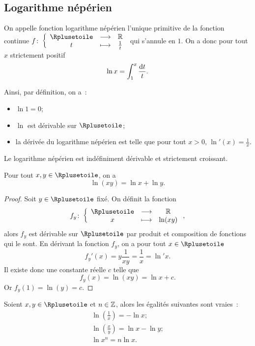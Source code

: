 \subsection{Logarithme népérien}
\label{subsec:chap1-lognep}
%
\begin{defdef}
\label{def:chap1-deflognep}
On appelle fonction logarithme népérien l'unique primitive de la fonction continue $\fonction{f}{\Rplusetoile}{\R}{t}{\frac{1}{t}}$ qui s'annule en $1$. On a donc pour tout $x$ strictement positif
\begin{equation} 
  \ln x=\int_{1}^{x} \frac{\mathop{}\mathopen{}\mathrm{d} t}{t}.
\end{equation}
\end{defdef}
%
Ainsi, par définition, on a~: 
\begin{itemize}
\item $\ln 1 = 0$;
\item $\ln$ est dérivable sur $\Rplusetoile$;
\item la dérivée du logarithme népérien est telle que pour tout $x>0$, $\ln'(x)=\frac{1}{x}$.
\end{itemize}
Le logarithme népérien est indéfiniment dérivable et strictement croissant.
%
\begin{theo}
\label{theo:lognep1}
  Pour tout $x, y \in \Rplusetoile$, on a 
  \begin{equation} 
    \ln(xy)=\ln x + \ln y. 
  \end{equation}  
\end{theo}
\begin{proof}
  Soit $y \in \Rplusetoile$ fixé. On définit la fonction 
  \begin{equation}
    \fonction{f_y}{\Rplusetoile}{\R}{x}{\ln(xy)},
  \end{equation}
  alors $f_y$ est dérivable sur $\Rplusetoile$ par produit et composition de fonctions qui le sont. En dérivant la fonction $f_y$, on a pour tout $x \in \Rplusetoile$
   \begin{equation} 
     f_y'(x)=y \frac{1}{xy}=\frac{1}{x}=\ln' x.
   \end{equation}
  Il existe donc une constante réelle $c$ telle que 
  \begin{equation} 
    f_y(x)=\ln(xy)=\ln x + c.
  \end{equation}
  Or $f_y(1)=\ln(y)=c$.
\end{proof}
%
\begin{prop}
  Soient $x, y \in \Rplusetoile$ et $n \in \mathbb{Z}$, alors les égalités suivantes sont vraies~:
  \begin{gather}
    \ln \left(\frac{1}{x}\right)=-\ln x;\\
    \ln \left(\frac{x}{y}\right)=\ln x - \ln y; \\
    \ln x^n=n\ln x.
  \end{gather}
\end{prop}
